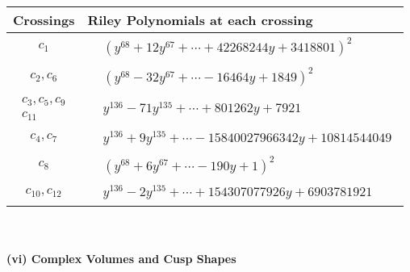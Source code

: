 \documentclass[1p]{elsarticle_modified}
\theoremstyle{definition}
\begin{document}
\begin{tabular}{m{50pt}|m{274pt}}
Crossings & \hspace{64pt}Riley Polynomials at each crossing \\
\hline $$\begin{aligned}c_{1}\end{aligned}$$&$\begin{aligned}
&(y^{68}+12 y^{67}+\cdots+42268244 y+3418801)^{2}
\end{aligned}$\\
\hline $$\begin{aligned}c_{2},c_{6}\end{aligned}$$&$\begin{aligned}
&(y^{68}-32 y^{67}+\cdots-16464 y+1849)^{2}
\end{aligned}$\\
\hline $$\begin{aligned}c_{3},c_{5},c_{9}\\c_{11}\end{aligned}$$&$\begin{aligned}
&y^{136}-71 y^{135}+\cdots+801262 y+7921
\end{aligned}$\\
\hline $$\begin{aligned}c_{4},c_{7}\end{aligned}$$&$\begin{aligned}
&y^{136}+9 y^{135}+\cdots-15840027966342 y+10814544049
\end{aligned}$\\
\hline $$\begin{aligned}c_{8}\end{aligned}$$&$\begin{aligned}
&(y^{68}+6 y^{67}+\cdots-190 y+1)^{2}
\end{aligned}$\\
\hline $$\begin{aligned}c_{10},c_{12}\end{aligned}$$&$\begin{aligned}
&y^{136}-2 y^{135}+\cdots+154307077926 y+6903781921
\end{aligned}$\\
\hline
\end{tabular}\\~\\
\newpage\flushleft \textbf{(vi) Complex Volumes and Cusp Shapes}
\end{document}

